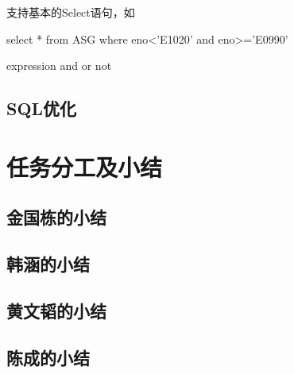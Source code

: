 \documentclass[a4paper, 12pt]{ctexart}
\begin{document}
支持基本的Select语句，如

select * from ASG where eno<’E1020’ and eno>=’E0990’


expression  and or not





\subsection{SQL优化}

\section{任务分工及小结}

\subsection{金国栋的小结}

\subsection{韩涵的小结}

\subsection{黄文韬的小结}

\subsection{陈成的小结}





 
\end{document}
